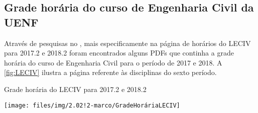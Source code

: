 \begin{comment}
Ele, assim com \citeonline{SanyaSantos2013}, também não considera a possibilidade de alocação de professores em mais de uma disciplina, múltiplas turmas de uma mesma disciplina, assim como não lida com a distribuição das salas. Ele também considera algumas disciplinas estão fixas, mesmo que pudessem sim ser modificadas por seu responsável, o Diretor do CCT.

Por fim, podemos citar um outro ponto que é a busca pela eficiência e baixo custo de tempo dos métodos utilizados. O que se mostra como ponto positivo, entretanto, mesmo com tamanha eficiência ainda peca em atingir a praticabilidade da solução.

\subsubsection*{\textbf{Parecer geral das divergências}} \label{sssec:divergencias} %

O entendimento das falhas passadas em se encontrar uma solução prática ao problema de Programação de Horários da UENF é de suma importância para que se possa evitar que os mesmos erros sejam cometidos novamente. Assim, é necessário que se tenha em mente que a realidade da universidade é dinâmica, e que a solução deve ser capaz de se adaptar a esta dinamicidade.

Vale-se também relembrar o que é dito por \citeonline{Murray2007} que citam em seu trabalho justamente sobre a complexidade presente na modelagem do problema.
\end{comment}

\subsection{Grade horária do curso de Engenharia Civil da UENF} \label{ssec:leciv}                        %

Através de pesquisas no , mais especificamente na página de horários do LECIV para 2017.2 e 2018.2 foram encontrados alguns PDFs que continha a grade horária do curso de Engenharia Civil para o período de 2017 e 2018. A \autoref{fig:LECIV} ilustra a página referente às disciplinas do sexto período.

\begin{CenteredFigure} \caption{Grade horária do LECIV para 2017.2 e 2018.2} \label{fig:LECIV}
  \texttt{[image: files/img/2.02!2-marco/GradeHoráriaLECIV]}
\end{CenteredFigure}

